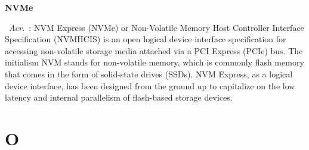 \documentclass[10pt,a4paper,twoside]{article} %
\newcommand{\entry}[3]{\textbf{#1}\markboth{#1}{#1}\  \textit{#2}\ :  {#3}} %
\begin{document}
\begin{multicols}{2}
\entry{NVMe}{Acr.}{NVM Express (NVMe) or Non-Volatile Memory Host Controller Interface Specification (NVMHCIS) is an open logical device interface specification for accessing non-volatile storage media attached via a PCI Express (PCIe) bus. The initialism NVM stands for non-volatile memory, which is commonly flash memory that comes in the form of solid-state drives (SSDs). NVM Express, as a logical device interface, has been designed from the ground up to capitalize on the low latency and internal parallelism of flash-based storage devices.}

\end{multicols}


\section*{O}
\end{document}
